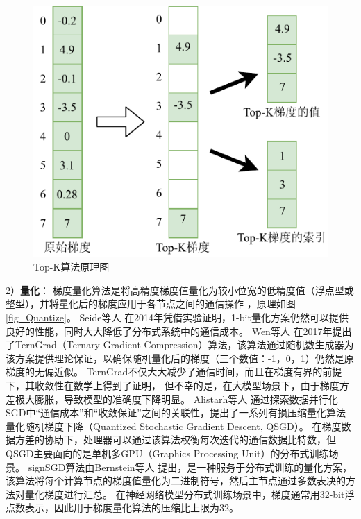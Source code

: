 \documentclass{xdupgthesis}
\begin{document}
\begin{figure}[htb]
    \centering
    \includegraphics[height=0.53\textwidth]{Top-k.pdf}
    \caption{Top-K算法原理图}
    \label{fig_Top-k}
\end{figure}

2）\textbf{量化}：
梯度量化算法是将高精度梯度值量化为较小位宽的低精度值（浮点型或整型），并将量化后的梯度应用于各节点之间的通信操作 \cite{karimireddy2019error}，原理如图 \ref{fig_Quantize}。
Seide等人 \cite{seide20141}在2014年凭借实验证明，1-bit量化方案仍然可以提供良好的性能，同时大大降低了分布式系统中的通信成本。
Wen等人 \cite{wen2017terngrad}在2017年提出了TernGrad（Ternary Gradient Compression）算法，该算法通过随机数生成器为该方案提供理论保证，以确保随机量化后的梯度（三个数值：-1，0，1）仍然是原梯度的无偏近似。
TernGrad不仅大大减少了通信时间，而且在梯度有界的前提下，其收敛性在数学上得到了证明，
但不幸的是，在大模型场景下，由于梯度方差极大膨胀，导致模型的准确度下降明显。
Alistarh等人 \cite{alistarh2017qsgd}通过探索数据并行化SGD中“通信成本”和“收敛保证”之间的关联性，提出了一系列有损压缩量化算法$\textbf{-}$量化随机梯度下降（Quantized Stochastic Gradient Descent, QSGD）。
在梯度数据方差的协助下，处理器可以通过该算法权衡每次迭代的通信数据比特数，但QSGD主要面向的是单机多GPU（Graphics Processing Unit）的分布式训练场景。
signSGD算法由Bernstein等人 \cite{bernstein2018signsgd}提出，是一种服务于分布式训练的量化方案，
该算法将每个计算节点的梯度值量化为二进制符号，然后主节点通过多数表决的方法对量化梯度进行汇总。
在神经网络模型分布式训练场景中，梯度通常用32-bit浮点数表示，因此用于梯度量化算法的压缩比上限为32。
\end{document}

